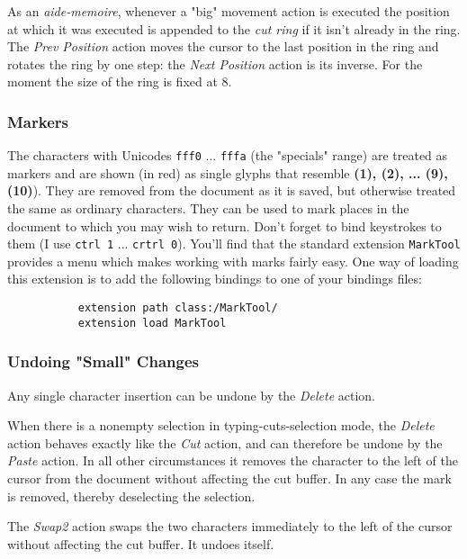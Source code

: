 \documentclass[
]{article}
\begin{document}
As an \emph{aide-memoire}, whenever a "big" movement action is executed
the position at which it was executed is appended to the \emph{cut ring}
if it isn't already in the ring. The \emph{Prev Position} action moves
the cursor to the last position in the ring and rotates the ring by one
step: the \emph{Next Position} action is its inverse. For the moment the
size of the ring is fixed at 8.

\hypertarget{markers}{%
\subsubsection{Markers}\label{markers}}

The characters with Unicodes \texttt{fff0} ... \texttt{fffa} (the
"specials" range) are treated as markers and are shown (in red) as
single glyphs that resemble \textbf{(1), (2), ... (9), (10)}). They are
removed from the document as it is saved, but otherwise treated the same
as ordinary characters. They can be used to mark places in the document
to which you may wish to return. Don't forget to bind keystrokes to them
(I use \texttt{ctrl\ 1} ... \texttt{crtrl\ 0}). You'll find that the
standard extension \texttt{MarkTool} provides a menu which makes working
with marks fairly easy. One way of loading this extension is to add the
following bindings to one of your bindings files:

\begin{verbatim}
           extension path class:/MarkTool/
           extension load MarkTool                  
\end{verbatim}

\hypertarget{undoing-small-changes}{%
\subsubsection{Undoing "Small" Changes}\label{undoing-small-changes}}

Any single character insertion can be undone by the \emph{Delete}
action.

When there is a nonempty selection in typing-cuts-selection mode, the
\emph{Delete} action behaves exactly like the \emph{Cut} action, and can
therefore be undone by the \emph{Paste} action. In all other
circumstances it removes the character to the left of the cursor from
the document without affecting the cut buffer. In any case the mark is
removed, thereby deselecting the selection.

The \emph{Swap2} action swaps the two characters immediately to the left
of the cursor without affecting the cut buffer. It undoes itself.
\end{document}
